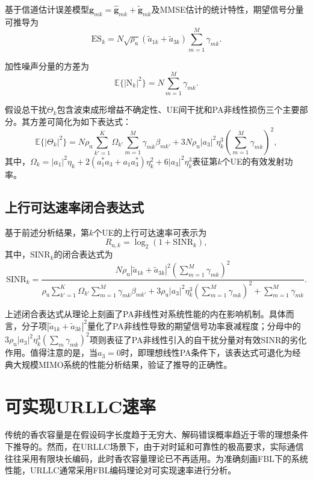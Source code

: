 基于信道估计误差模型$\mathbf{g}_{mk} = \hat{\mathbf{g}}_{mk} + \tilde{\mathbf{g}}_{mk}$及MMSE估计的统计特性，期望信号分量可推导为
\begin{equation}
\text{ES}_k = N\sqrt{\rho_\text{u}}(\tilde{a}_{1k}+\tilde{a}_{3k})\sum_{m=1}^{M}\gamma_{mk}.
\end{equation}

加性噪声分量的方差为
\begin{equation}
\mathbb{E}\{|\text{N}_k|^2\} = N\sum_{m=1}^{M}\gamma_{mk}.
\end{equation}

假设总干扰$\Theta_k$包含波束成形增益不确定性、UE间干扰和PA非线性损伤三个主要部分。其方差可简化为如下表达式：
\begin{equation}
\mathbb{E}\{|\Theta_k|^2\} = N\rho_\text{u}\sum_{k'=1}^{K}\Omega_{k'}\sum_{m=1}^{M}\gamma_{mk}\beta_{mk'} + 3N\rho_\text{u}|a_3|^2\eta_k^3\left(\sum_{m=1}^{M}\gamma_{mk}\right)^2,
\end{equation}
其中，$\Omega_k = |a_1|^2\eta_k + 2(a_1^*a_3+a_1a_3^*)\eta_k^2 + 6|a_3|^2\eta_k^3$表征第$k$个UE的有效发射功率。

\subsection{上行可达速率闭合表达式}

基于前述分析结果，第$k$个UE的上行可达速率可表示为
\begin{equation}
R_{\text{u},k} = \log_2\left(1 + \text{SINR}_k\right),
\end{equation}
其中，$\text{SINR}_k$的闭合表达式为
\begin{equation}\label{SINR}
\text{SINR}_k = \frac{N\rho_\text{u}|\tilde{a}_{1k}+\tilde{a}_{3k}|^2\left(\sum_{m=1}^{M}\gamma_{mk}\right)^2}{\rho_\text{u}\sum_{k'=1}^{K}\Omega_{k'}\sum_{m=1}^{M}\gamma_{mk}\beta_{mk'} + 3\rho_\text{u}|a_3|^2\eta_k^3\left(\sum_{m=1}^{M}\gamma_{mk}\right)^2 + \sum_{m=1}^{M}\gamma_{mk}}.
\end{equation}

上述闭合表达式从理论上刻画了PA非线性对系统性能的内在影响机制。具体而言，分子项$|\tilde{a}_{1k}+\tilde{a}_{3k}|^2$量化了PA非线性导致的期望信号功率衰减程度；分母中的$3\rho_\text{u}|a_3|^2\eta_k^3(\sum_{m}\gamma_{mk})^2$项则表征了PA非线性引入的自干扰分量对有效SINR的劣化作用。值得注意的是，当$a_3 = 0$时，即理想线性PA条件下，该表达式可退化为经典大规模MIMO系统的性能分析结果，验证了推导的正确性。

\section{可实现URLLC速率}
传统的香农容量是在假设码字长度趋于无穷大、解码错误概率趋近于零的理想条件下推导的。然而，在URLLC场景下，由于对时延和可靠性的极高要求，实际通信往往采用有限块长编码，此时香农容量理论已不再适用。为准确刻画FBL下的系统性能，URLLC通常采用FBL编码理论对可实现速率进行分析。

